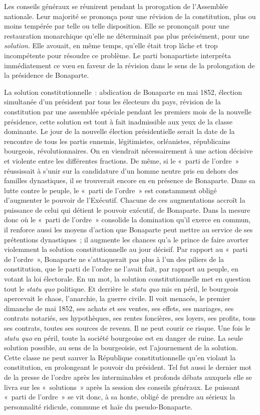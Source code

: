 \documentclass[twoside]{book} %
\begin{document}
Les conseils généraux se réunirent pendant la prorogation de l’Assemblée nationale. Leur majorité se prononça pour une révision de la constitution, plus ou moins tempérée par telle ou telle disposition. Elle se prononçait pour une restauration monarchique qu’elle ne déterminait pas plus précisément, pour une \emph{solution}. Elle avouait, en même temps, qu’elle était trop lâche et trop incompétente pour résoudre ce problème. Le parti bonapartiste interpréta immédiatement ce vœu en faveur de la révision dans le sens de la prolongation de la présidence de Bonaparte.\par
La solution constitutionnelle : abdication de Bonaparte en mai 1852, élection simultanée d’un président par tous les électeurs du pays, révision de la constitution par une assemblée spéciale pendant les premiers mois de la nouvelle présidence, cette solution est tout à fait inadmissible aux yeux de la classe dominante. Le jour de la nouvelle élection présidentielle serait la date de la rencontre de tous les partis ennemis, légitimistes, orléanistes, républicains bourgeois, révolutionnaires. On en viendrait nécessairement à une action décisive et violente entre les différentes fractions. De même, si le « parti de l’ordre » réussissait à s’unir sur la candidature d’un homme neutre pris en dehors des familles dynastiques, il se trouverait encore en en présence de Bonaparte. Dans sa lutte contre le peuple, le « parti de l’ordre » est constamment obligé d’augmenter le pouvoir de l’Exécutif. Chacune de ces augmentations accroît la puissance de celui qui détient le pouvoir exécutif, de Bonaparte. Dans la mesure donc où le « parti de l’ordre » consolide la domination qu’il exerce en commun, il renforce aussi les moyens d’action que Bonaparte peut mettre au service de ses prétentions dynastiques ; il augmente les chances qu’a le prince de faire avorter violemment la solution constitutionnelle au jour décisif. Par rapport au « parti de l’ordre », Bonaparte ne s’attaquerait pas plus à l’un des piliers de la constitution, que le parti de l’ordre ne l’avait fait, par rapport au peuple, en votant la loi électorale. En un mot, la solution constitutionnelle met en question tout le \emph{statu quo} politique. Et derrière le \emph{statu quo} mis en péril, le bourgeois apercevait le chaos, l’anarchie, la guerre civile. Il voit menacés, le premier dimanche de mai 1852, ses achats et ses ventes, ses effets, ses mariages, ses contrats notariés, ses hypothèques, ses rentes foncières, ses loyers, ses profits, tous ses contrats, toutes ses sources de revenu. Il ne peut courir ce risque. Une fois le \emph{statu quo} en péril, toute la société bourgeoise est en danger de ruine. La seule solution possible, au sens de la bourgeoisie, est l’ajournement de la solution. Cette classe ne peut sauver la République constitutionnelle qu’en violant la constitution, en prolongeant le pouvoir du président. Tel fut aussi le dernier mot de la presse de l’ordre après les interminables et profonds débats auxquels elle se livra sur les « solutions » après la session des conseils généraux. Le puissant « parti de l’ordre » se vit donc, à sa honte, obligé de prendre au sérieux la personnalité ridicule, commune et haïe du pseudo-Bonaparte.\par
\end{document}
